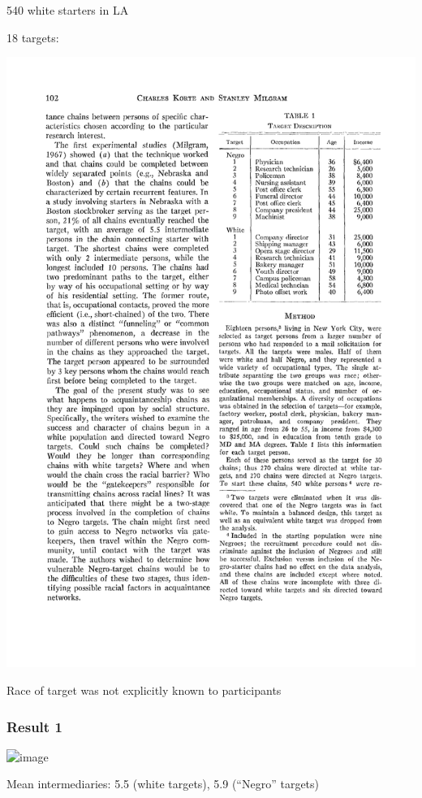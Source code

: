 \documentclass[aspectratio=169]{beamer}
\begin{document}
\begin{frame}

540 white starters in LA\\
\pause

18 targets:
\begin{center}
\includegraphics[height=0.6\textheight]{figures/korte_aquaintance_1970_tab1}
\end{center}

\vfill
Race of target was not explicitly known to participants


\end{frame}
\begin{frame}
\frametitle{Result 1}

\begin{center}
\includegraphics<1>[height=0.8\textheight]{figures/korte_aquaintance_1970_fig1}
\end{center}

Mean intermediaries: 5.5 (white targets), 5.9 (``Negro'' targets)

\end{frame}
\end{document}
